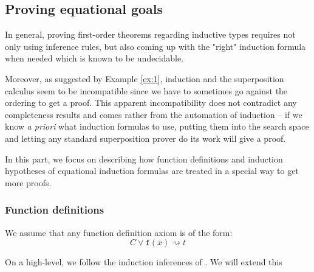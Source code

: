 
\subsection{Proving equational goals}
In general, proving first-order theorems regarding inductive types requires not only using inference rules, but also coming up with the "right" induction formula when needed which is known to be undecidable.

Moreover, as suggested by Example \ref{ex:1}, induction and the superposition calculus seem to be incompatible since we have to sometimes go against the ordering to get a proof. This apparent incompatibility does not contradict any completeness results and comes rather from the automation of induction -- if we know \textit{a priori} what induction formulas to use, putting them into the search space and letting any standard superposition prover do its work will give a proof.

In this part, we focus on describing how function definitions and induction hypotheses of equational induction formulas are treated in a special way to get more proofs.

\subsubsection{Function definitions}
We assume that any function definition axiom is of the form:
$$C\lor \mathtt{f}(\overline{x}) \rightsquigarrow t$$

On a high-level, we follow the induction inferences of \cite{vampireinduction,vampiregeneralization}. We will extend this 